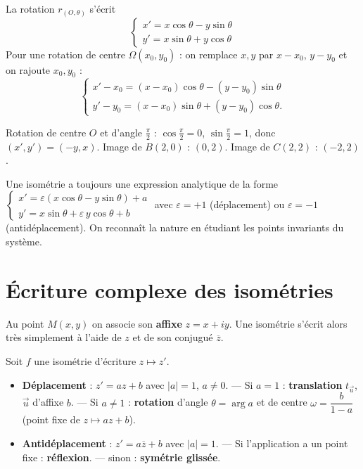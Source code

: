 \begin{propriete}
La rotation $r_{(O,\theta)}$ s'écrit
\[
\begin{cases}
x'=x\cos\theta-y\sin\theta\\
y'=x\sin\theta+y\cos\theta
\end{cases}
\]
Pour une rotation de centre $\Omega(x_0,y_0)$ : on remplace $x,y$ par $x-x_0,\,y-y_0$ et on rajoute $x_0,y_0$ :
\[
\begin{cases}
x'-x_0=(x-x_0)\cos\theta-(y-y_0)\sin\theta\\
y'-y_0=(x-x_0)\sin\theta+(y-y_0)\cos\theta.
\end{cases}
\]
\end{propriete}

\begin{exemple}
Rotation de centre $O$ et d'angle $\frac\pi2$ : $\cos\frac\pi2=0$, $\sin\frac\pi2=1$, donc $(x',y')=(-y,x)$. Image de $B(2,0)$ : $(0,2)$. Image de $C(2,2)$ : $(-2,2)$.
\end{exemple}

\begin{remarque}
Une isométrie a toujours une expression analytique de la forme $\begin{cases}x'=\varepsilon(x\cos\theta-y\sin\theta)+a\\ y'=x\sin\theta+\varepsilon\,y\cos\theta+b\end{cases}$ avec $\varepsilon=+1$ (déplacement) ou $\varepsilon=-1$ (antidéplacement). On reconnaît la nature en étudiant les points invariants du système.
\end{remarque}

\section{Écriture complexe des isométries}

Au point $M(x,y)$ on associe son \textbf{affixe} $z=x+iy$. Une isométrie s'écrit alors très simplement à l'aide de $z$ et de son conjugué $\overline z$.

\begin{propriete}
Soit $f$ une isométrie d'écriture $z\mapsto z'$.
\begin{itemize}
\item \textbf{Déplacement} : $z'=az+b$ avec $|a|=1$, $a\neq0$.
\quad — Si $a=1$ : \textbf{translation} $t_{\vec u}$, $\vec u$ d'affixe $b$.
\quad — Si $a\neq1$ : \textbf{rotation} d'angle $\theta=\arg a$ et de centre $\omega=\dfrac{b}{1-a}$ (point fixe de $z\mapsto az+b$).
\item \textbf{Antidéplacement} : $z'=a\overline z+b$ avec $|a|=1$.
\quad — Si l'application a un point fixe : \textbf{réflexion}.
\quad — sinon : \textbf{symétrie glissée}.
\end{itemize}
\end{propriete}

